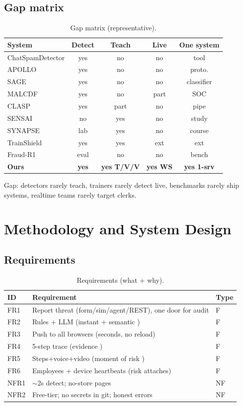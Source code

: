 \documentclass[11pt,a4paper]{article}
\begin{document}
\subsection{Gap matrix}
\begin{table}[h]\centering\caption{Gap matrix (representative).}\label{tab:gap}\begin{tabular}{@{}lcccc@{}}\toprule System & Detect & Teach & Live & One system\\\midrule ChatSpamDetector \cite{Koide24} & yes & no & no & tool\\
APOLLO \cite{Desolda24} & yes & no & no & proto.\\
SAGE \cite{SAGE26} & yes & no & no & classifier\\
MALCDF \cite{MALCDF25} & yes & no & part & SOC\\
CLASP \cite{CLASP25} & yes & part & no & pipe\\
SENSAI \cite{SENSAI25} & no & yes & no & study\\
SYNAPSE \cite{SYNAPSE26} & lab & yes & no & course\\
TrainShield \cite{TrainShield25} & yes & yes & ext & ext\\
Fraud-R1 \cite{FraudR125} & eval & no & no & bench\\
\textbf{Ours} & \textbf{yes} & \textbf{yes T/V/V} & \textbf{yes WS} & \textbf{yes 1-srv}\\\bottomrule\end{tabular}\end{table}
Gap: detectors rarely teach, trainers rarely detect live, benchmarks rarely ship systems, realtime teams rarely target clerks.

\section{Methodology and System Design}
\subsection{Requirements}
\begin{table}[h]\centering\caption{Requirements (what + why).}\begin{tabular}{@{}lp{9cm}l@{}}\toprule ID & Requirement & Type\\\midrule FR1 & Report threat (form/sim/agent/REST), one door for audit & F\\
FR2 & Rules + LLM (instant + semantic \cite{Nair25,Algo25}) & F\\
FR3 & Push to all browsers (seconds, no reload) & F\\
FR4 & 5-step trace (evidence \cite{Koide24,Desolda24}) & F\\
FR5 & Steps+voice+video (moment of risk \cite{SchoniCHI25,TrainShield25}) & F\\
FR6 & Employees + device heartbeats (risk attaches) & F\\
NFR1 & $\sim$2s detect; no-store pages & NF\\
NFR2 & Free-tier; no secrets in git; honest errors & NF\\\bottomrule\end{tabular}\end{table}
\end{document}
